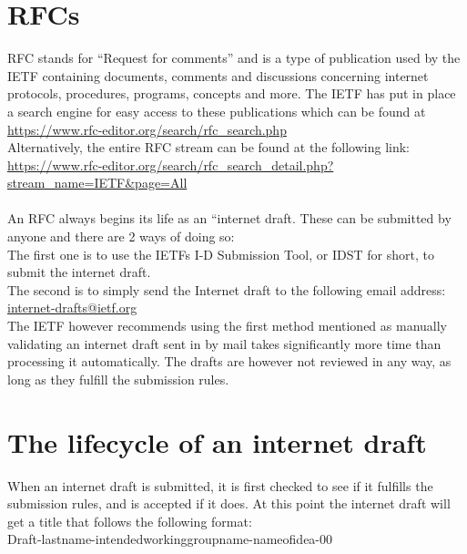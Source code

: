 \documentclass[a4paper,english]{report}
\begin{document}
\section{RFCs}
RFC stands for “Request for comments” and is a type of publication used by the IETF containing documents, comments and discussions concerning internet protocols, procedures, programs, concepts and more. The IETF has put in place a search engine for easy access to these publications which can be found at\\

\url{https://www.rfc-editor.org/search/rfc_search.php}\\

Alternatively, the entire RFC stream can be found at the following link:\\

\url{https://www.rfc-editor.org/search/rfc_search_detail.php?stream_name=IETF&page=All}\\\\

An RFC always begins its life as an “internet draft. These can be submitted by anyone and there are 2 ways of doing so:\\ The first one is to use the IETFs I-D Submission Tool, or IDST for short, to submit the internet draft.\\The second is to simply send the Internet draft to the following email address:\\

\url{internet-drafts@ietf.org}\\

The IETF however recommends using the first method mentioned as manually validating an  internet draft sent in by mail takes significantly more time than processing it automatically. The drafts are however not reviewed in any way, as long as they fulfill the submission rules.

\section{The lifecycle of an internet draft}
When an internet draft is submitted, it is first checked to see if it fulfills the submission rules, and is accepted if  it does. At this point the internet draft will get a title that follows the following format:\\

Draft-lastname-intendedworkinggroupname-nameofidea-00\\
\end{document}
